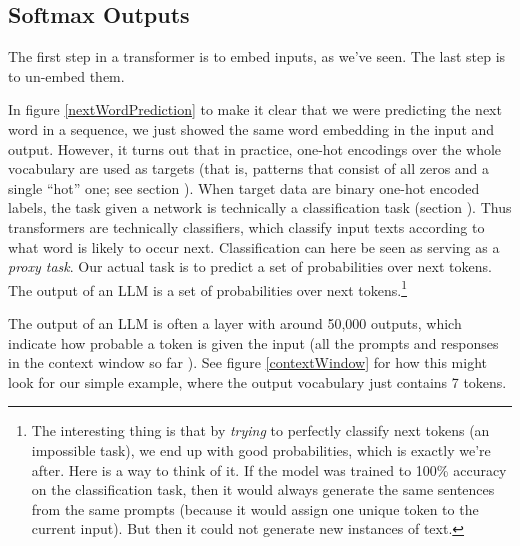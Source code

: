 \subsection{Softmax Outputs}\label{llmOutput}

The first step in a transformer is to embed inputs, as we've seen. The last step is to un-embed them. 

In figure \ref{nextWordPrediction} to make it clear that we were predicting the next word in a sequence, we just showed the same word embedding in the input and output.  However, it turns out that in practice, one-hot encodings over the whole vocabulary are used as targets (that is, patterns that consist of all zeros and a single ``hot'' one; see section ). When target data are binary one-hot encoded labels, the task given a network is technically a classification task (section ). Thus transformers are technically classifiers, which classify input texts according to what word is likely to occur next. Classification can here be seen as serving as a \emph{proxy task}. Our actual task is to predict a set of probabilities over next tokens. The output of an LLM is a set of probabilities over next tokens.\footnote{The interesting thing is that by \emph{trying} to perfectly classify next tokens (an impossible task), we end up with good probabilities, which is exactly we're after. Here is a way to think of it. If the model was trained to 100\% accuracy on the classification task, then it would always generate the same sentences from the same prompts (because it would assign one unique token to the current input). But then it could not generate new instances of text.}

The output of an LLM is often a  layer with around 50,000 outputs,  which  indicate how probable a token is given the input (all the prompts and responses in the context window so far ). See figure \ref{contextWindow} for how this might look for our simple example, where the output vocabulary just contains 7 tokens.

